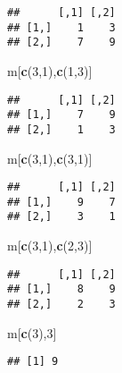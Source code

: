\documentclass[
]{article}
\newenvironment{Shaded}{\begin{snugshade}}{\end{snugshade}}
\newcommand{\DecValTok}[1]{\textcolor[rgb]{0.00,0.00,0.81}{#1}}
\newcommand{\KeywordTok}[1]{\textcolor[rgb]{0.13,0.29,0.53}{\textbf{#1}}}
\newcommand{\NormalTok}[1]{#1}
\begin{document}
\begin{verbatim}
##      [,1] [,2]
## [1,]    1    3
## [2,]    7    9
\end{verbatim}

\begin{Shaded}
\begin{Highlighting}[]
\NormalTok{m[}\KeywordTok{c}\NormalTok{(}\DecValTok{3}\NormalTok{,}\DecValTok{1}\NormalTok{),}\KeywordTok{c}\NormalTok{(}\DecValTok{1}\NormalTok{,}\DecValTok{3}\NormalTok{)]}
\end{Highlighting}
\end{Shaded}

\begin{verbatim}
##      [,1] [,2]
## [1,]    7    9
## [2,]    1    3
\end{verbatim}

\begin{Shaded}
\begin{Highlighting}[]
\NormalTok{m[}\KeywordTok{c}\NormalTok{(}\DecValTok{3}\NormalTok{,}\DecValTok{1}\NormalTok{),}\KeywordTok{c}\NormalTok{(}\DecValTok{3}\NormalTok{,}\DecValTok{1}\NormalTok{)]}
\end{Highlighting}
\end{Shaded}

\begin{verbatim}
##      [,1] [,2]
## [1,]    9    7
## [2,]    3    1
\end{verbatim}

\begin{Shaded}
\begin{Highlighting}[]
\NormalTok{m[}\KeywordTok{c}\NormalTok{(}\DecValTok{3}\NormalTok{,}\DecValTok{1}\NormalTok{),}\KeywordTok{c}\NormalTok{(}\DecValTok{2}\NormalTok{,}\DecValTok{3}\NormalTok{)]}
\end{Highlighting}
\end{Shaded}

\begin{verbatim}
##      [,1] [,2]
## [1,]    8    9
## [2,]    2    3
\end{verbatim}

\begin{Shaded}
\begin{Highlighting}[]
\NormalTok{m[}\KeywordTok{c}\NormalTok{(}\DecValTok{3}\NormalTok{),}\DecValTok{3}\NormalTok{]}
\end{Highlighting}
\end{Shaded}

\begin{verbatim}
## [1] 9
\end{verbatim}
\end{document}
